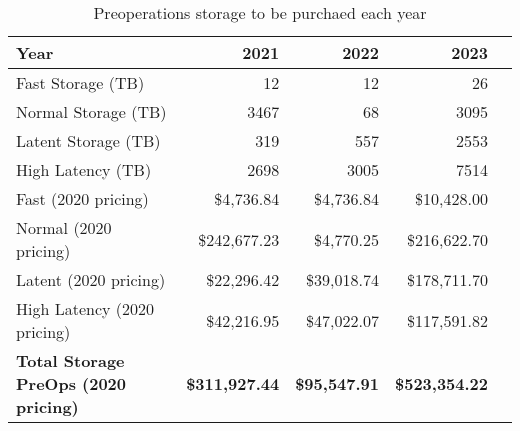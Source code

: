 \tiny \begin{longtable} { |p{}  |r  |r  |r  |r |} 
\caption{Preoperations storage to be purchaed each year \label{tab:preStorage}}\\ 
\hline 
\textbf{Year }&\textbf{2021}&\textbf{2022}&\textbf{2023} \\ \hline
{Fast Storage (TB)}&{12}&{12}&{26} \\ \hline
{Normal Storage (TB)}&{3467}&{68}&{3095} \\ \hline
{Latent Storage  (TB)}&{319}&{557}&{2553} \\ \hline
{High Latency (TB)}&{2698}&{3005}&{7514} \\ \hline
{Fast (2020 pricing)}&{\$4,736.84}&{\$4,736.84}&{\$10,428.00} \\ \hline
{Normal (2020 pricing)}&{\$242,677.23}&{\$4,770.25}&{\$216,622.70} \\ \hline
{Latent (2020 pricing)}&{\$22,296.42}&{\$39,018.74}&{\$178,711.70} \\ \hline
{High Latency (2020 pricing)}&{\$42,216.95}&{\$47,022.07}&{\$117,591.82} \\ \hline
\textbf{Total Storage PreOps (2020 pricing)}&\textbf{\$311,927.44}&\textbf{\$95,547.91}&\textbf{\$523,354.22} \\ \hline
\end{longtable} \normalsize
